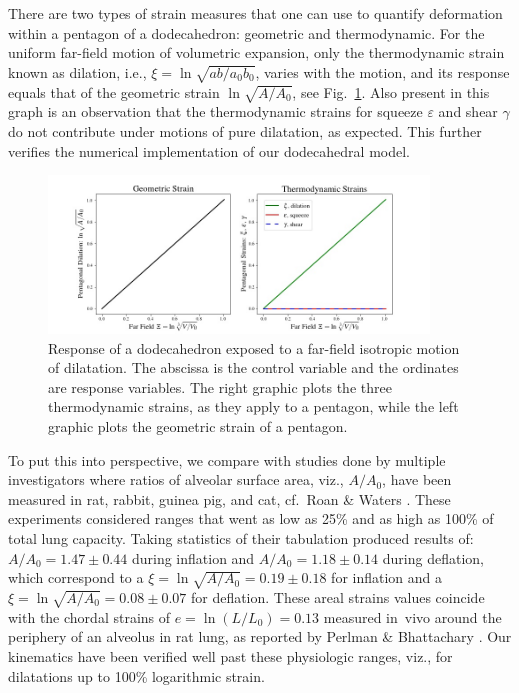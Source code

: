 There are two types of strain measures that one can use to quantify deformation within a pentagon of a dodecahedron: geometric and thermo\-dynamic.  For the uniform far-field motion of volumetric expansion, only the thermo\-dynamic strain known as dilation, i.e., $\xi = \ln \sqrt{ab/a_0b_0}$, varies with the motion, and its response equals that of the geometric strain $\ln \sqrt{A / A_0}$, see Fig.~\ref{figDilatation2}.  Also present in this graph is an observation that the thermo\-dynamic strains for squeeze $\varepsilon$ and shear $\gamma$ do not contribute under motions of pure dilatation, as expected.  This further verifies the numerical implementation of our dodecahedral model.

\begin{figure}
	\centering
	\includegraphics[width=0.9\textwidth]{figures/dilatationGeoVsThermo.jpg}
	\caption{Response of a dodecahedron exposed to a far-field isotropic motion of dilatation.  The abscissa is the control variable and the ordinates are response variables. The right graphic plots the three thermo\-dynamic strains, as they apply to a pentagon, while the left graphic plots the geometric strain of a pentagon.}
	\label{figDilatation2}
\end{figure}

To put this into perspective, we compare with studies done by multiple investigators where ratios of alveolar surface area, viz., $A/A_0$, have been measured in rat, rabbit, guinea pig, and cat, cf.\ Roan \& Waters \cite[Table~1]{RoanWaters11}.  These experiments considered ranges that went as low as 25\% and as high as 100\% of total lung capacity.  Taking statistics of their tabulation produced results of: $A/A_0 = 1.47 \pm 0.44$ during inflation and $A/A_0 = 1.18 \pm 0.14$ during deflation, which correspond to a $\xi = \ln\sqrt{A/A_0} = 0.19 \pm 0.18$ for inflation and a $\xi = \ln\sqrt{A/A_0} = 0.08 \pm 0.07$ for deflation.  These areal strains values coincide with the chordal strains of $e=\ln(L/L_0) = 0.13$ measured in~vivo around the periphery of an alveolus in rat lung, as reported by Perlman \& Bhattachary \cite{PerlmanBhattacharya07}.  Our kinematics have been verified well past these physiologic ranges, viz., for dilatations up to 100\% logarithmic strain. 

